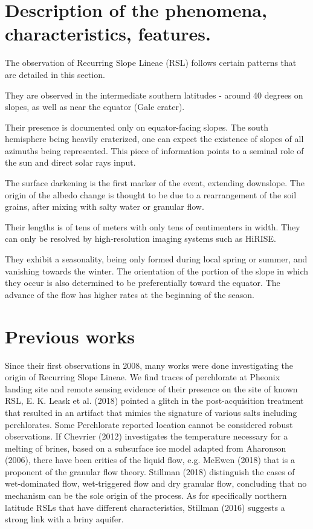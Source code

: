 \documentclass{report}
\begin{document}
\section{Description of the phenomena, characteristics, features.}
The observation of Recurring Slope Lineae (RSL) follows certain patterns that are detailed in this section.

They are observed in the intermediate southern latitudes - around 40 degrees on slopes, as well as near the equator (Gale crater). 

Their presence is documented only on equator-facing slopes. The south hemisphere being heavily craterized, one can expect the existence of slopes of all azimuths being represented. This piece of information points to a seminal role of the sun and direct solar rays input. 

The surface darkening is the first marker of the event, extending downslope. The origin of the albedo change is thought to be due to a rearrangement of the soil grains, after mixing with salty water or granular flow.  

Their lengths is of tens of meters with only tens of centimenters in width. They can only be resolved by high-resolution imaging systems such as HiRISE. 

They exhibit a seasonality, being only formed during local spring or summer, and vanishing towards the winter.
The orientation of the portion of the slope in which they occur is also determined to be preferentially toward the equator. 
The advance of the flow has higher rates at the beginning of the season.

\section{Previous works}

Since their first observations in 2008, many works were done investigating the origin of Recurring Slope Lineae.
We find traces of perchlorate at Pheonix landing site and remote sensing evidence of their presence on the site of known RSL, E. K. Leask et al. (2018) pointed a glitch in the post-acquisition treatment that resulted in an artifact that mimics the signature of various salts including perchlorates. Some Perchlorate reported location cannot be considered robust observations.  
If Chevrier (2012) investigates the temperature necessary for a melting of brines, based on a subsurface ice model adapted from Aharonson (2006), there have been critics of the liquid flow, e.g. McEwen (2018) that is a proponent of the granular flow theory. Stillman (2018) distinguish the cases of wet-dominated flow, wet-triggered flow and dry granular flow, concluding that no mechanism can be the sole origin of the process. 
As for specifically northern latitude RSLs that have different characteristics, Stillman (2016) suggests a strong link with a briny aquifer.  
\end{document}

